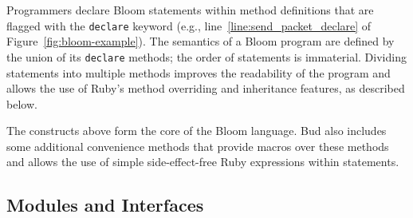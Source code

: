 
Programmers declare Bloom statements within method definitions that are flagged
with the \texttt{declare} keyword (e.g., line~\ref{line:send_packet_declare} of
Figure~\ref{fig:bloom-example}). The semantics of a Bloom program are defined by
the union of its \texttt{declare} methods; the order of statements is
immaterial. Dividing statements into multiple methods improves the readability
of the program and allows the use of Ruby's method overriding and inheritance
features, as described below.


The constructs above form the core of the Bloom language.
Bud also includes some additional convenience methods that provide macros over
these methods and allows the use of simple side-effect-free Ruby expressions
within statements.

\subsection{Modules and Interfaces}
\label{sec:modularity}
\begin{comment}
\jmh{More is needed here.  First, you need to introduce the use of interfaces: inputs on rhs of rules, outputs on lhs.  Two modules compose if they reference each other's interface collections in this pattern.  Note that this is local and synchronous composition at the interfaces, though a given module may itself have asynchronous or distributed behaviors inside.  Second, you need to talk about how we use Ruby's inheritance and mixin features.  This probably deserves a subsection on Modularity and Inheritance or something.}
\end{comment}

